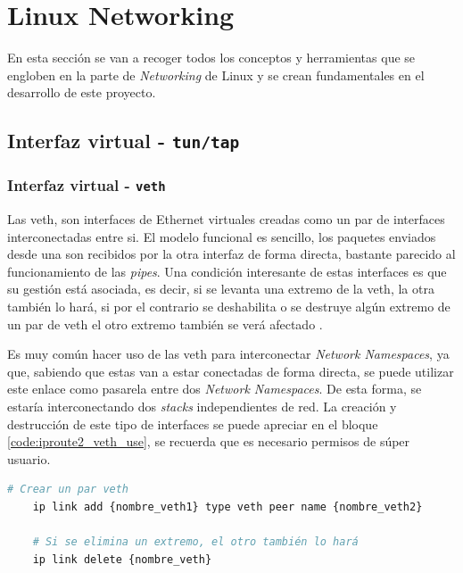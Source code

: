 \section{Linux Networking}
\label{sec:linuxNetworking}

En esta sección se van a recoger todos los conceptos y herramientas que se engloben en la parte de \textit{Networking} de Linux y se crean fundamentales en el desarrollo de este proyecto.




\subsection{Interfaz virtual - \texttt{tun/tap}}
\label{linuxNetworking_tuntap}

\subsubsection{Interfaz virtual - \texttt{veth}}
\label{linuxVeths}
Las \gls{veth}, son interfaces de Ethernet virtuales creadas como un par de interfaces interconectadas entre si. El modelo funcional es sencillo, los paquetes enviados desde una son recibidos por la otra interfaz de forma directa, bastante parecido al funcionamiento de las \textit{pipes}. Una condición interesante de estas interfaces es que su gestión está asociada, es decir, si se levanta una extremo de la \gls{veth}, la otra también lo hará, si por el contrario se deshabilita o se destruye algún extremo de un par de \gls{veth} el otro extremo también se verá afectado \cite{veth}.\\
\par
Es muy común hacer uso de las \gls{veth} para interconectar \textit{Network Namespaces}, ya que, sabiendo que estas van a estar conectadas de forma directa, se puede utilizar este enlace como pasarela entre dos \textit{Network Namespaces}. De esta forma, se estaría interconectando dos \textit{stacks} independientes de red. La creación y destrucción de este tipo de interfaces se puede apreciar en el bloque \ref{code:iproute2_veth_use}, se recuerda que es necesario permisos de súper usuario.\\

\begin{lstlisting}[language= bash, style=Consola, caption={Manejo de Veths},label=code:iproute2_veth_use]
    # Crear un par veth
    ip link add {nombre_veth1} type veth peer name {nombre_veth2}
    
    # Si se elimina un extremo, el otro también lo hará
    ip link delete {nombre_veth}
    
\end{lstlisting}
\vspace{0.5cm}



